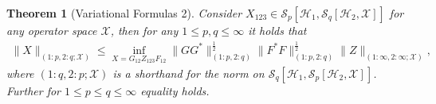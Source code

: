 \documentclass[11pt]{article}
\newcommand{\jk}[1]{\textcolor{cyan}{JK:~#1}}
\newcommand{\1}{\ensuremath{\mathbbm{1}}}
\theoremstyle{newdefinition}
\theoremstyle{newplain}
\newtheorem{theorem}[definition]{Theorem}
\theoremstyle{myplain}
\begin{document}
\begin{theorem}[Variational Formulas 2]\label{cor:variationalFormula}
Consider $X_{123}\in \mathcal{S}_p[\mathcal{H}_1,\mathcal{S}_q[\mathcal{H}_2,\mathcal{X}]]$ for any operator space $\mathcal{X}$, then for any $1\leq p,q\leq \infty$ it holds that
\begin{align}
       \|X\|_{(1:p,2:q;\mathcal{X})}\leq\inf_{ X=G_{12}Z_{123}F_{12}}\|GG^*\|^{\frac{1}{2}}_{(1:p,2:q)}\|F^*F\|^{\frac{1}{2}}_{(1:p,2:q)}\|Z\|_{(1:\infty,2:\infty;\mathcal{X})}, 
\end{align} where $(1:q,2:p;\mathcal{X})$ is a shorthand for the norm on $\mathcal{S}_q[\mathcal{H}_1,\mathcal{S}_p[\mathcal{H}_2,\mathcal{X}]]$.
Further for $1\leq p\leq q\leq \infty$ equality holds.
\end{theorem}
\end{document}
